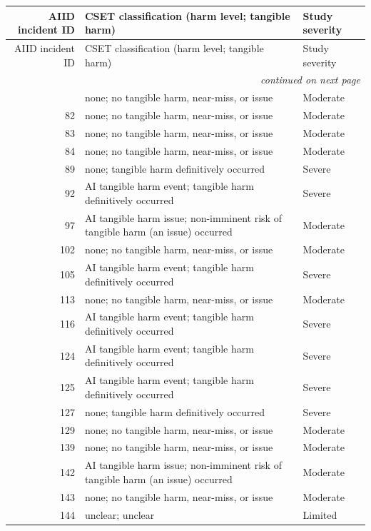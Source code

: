 \documentclass[11pt]{article}
\begin{document}
{\footnotesize
\begin{longtable}{@{}r p{9.2cm} l@{}}
\toprule
AIID incident ID & CSET classification (harm level; tangible harm) & Study severity \\
\midrule
\endfirsthead
\toprule
AIID incident ID & CSET classification (harm level; tangible harm) & Study severity \\
\midrule
\endhead
\midrule
\multicolumn{3}{r}{\emph{continued on next page}}\\
\endfoot
\bottomrule
\endlastfoot
81 & none; no tangible harm, near-miss, or issue & Moderate \\
82 & none; no tangible harm, near-miss, or issue & Moderate \\
83 & none; no tangible harm, near-miss, or issue & Moderate \\
84 & none; no tangible harm, near-miss, or issue & Moderate \\
89 & none; tangible harm definitively occurred & Severe \\
92 & AI tangible harm event; tangible harm definitively occurred & Severe \\
97 & AI tangible harm issue; non-imminent risk of tangible harm (an issue) occurred & Moderate \\
102 & none; no tangible harm, near-miss, or issue & Moderate \\
105 & AI tangible harm event; tangible harm definitively occurred & Severe \\
113 & none; no tangible harm, near-miss, or issue & Moderate \\
116 & AI tangible harm event; tangible harm definitively occurred & Severe \\
124 & AI tangible harm event; tangible harm definitively occurred & Severe \\
125 & AI tangible harm event; tangible harm definitively occurred & Severe \\
127 & none; tangible harm definitively occurred & Severe \\
129 & none; no tangible harm, near-miss, or issue & Moderate \\
139 & none; no tangible harm, near-miss, or issue & Moderate \\
142 & AI tangible harm issue; non-imminent risk of tangible harm (an issue) occurred & Moderate \\
143 & none; no tangible harm, near-miss, or issue & Moderate \\
144 & unclear; unclear & Limited \\

\end{longtable}}
\end{document}
